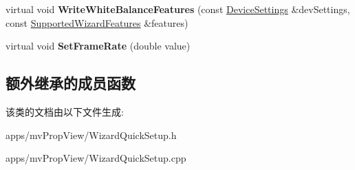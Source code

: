 \begin{DoxyCompactItemize}
\item 
\hypertarget{class_wizard_quick_setup_gen_i_cam_ac25c8c95aca76d9875ad4fd6c88cc79e}{virtual void {\bfseries Write\+White\+Balance\+Features} (const \hyperlink{struct_wizard_quick_setup_1_1_device_settings}{Device\+Settings} \&dev\+Settings, const \hyperlink{struct_wizard_quick_setup_1_1_supported_wizard_features}{Supported\+Wizard\+Features} \&features)}\label{class_wizard_quick_setup_gen_i_cam_ac25c8c95aca76d9875ad4fd6c88cc79e}

\item 
\hypertarget{class_wizard_quick_setup_gen_i_cam_ac980a0b0fd3606c3f7b0690d7357f634}{virtual void {\bfseries Set\+Frame\+Rate} (double value)}\label{class_wizard_quick_setup_gen_i_cam_ac980a0b0fd3606c3f7b0690d7357f634}

\end{DoxyCompactItemize}
\subsection*{额外继承的成员函数}


该类的文档由以下文件生成\+:\begin{DoxyCompactItemize}
\item 
apps/mv\+Prop\+View/Wizard\+Quick\+Setup.\+h\item 
apps/mv\+Prop\+View/Wizard\+Quick\+Setup.\+cpp\end{DoxyCompactItemize}
